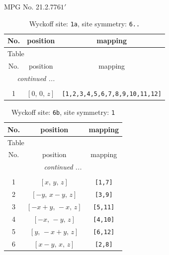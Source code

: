 \documentclass[fleqn,8pt]{jsarticle}
\begin{document}
\setcounter{MaxMatrixCols}{32}

\renewcommand{\tablename}{Table~}
\renewcommand{\figurename}{Figure~}
\begin{center}
\LARGE
MPG No. 21.2.77\quad$61'$
\end{center}
\renewcommand{\arraystretch}{1.2}
\begin{longtable}{ccc}
\caption{Wyckoff site: {\tt 1a}, site symmetry: {\tt 6..}}
 \\
 \hline \hline
No. & position & mapping \\ \hline \endfirsthead

\multicolumn{2}{l}{\tablename\ \thetable{}} \\
 \hline \hline
No. & position & mapping \\ \hline \endhead

 \hline \hline
\multicolumn{2}{r}{\footnotesize\it continued ...} \\ \endfoot

 \hline \hline
\multicolumn{2}{r}{} \\ \endlastfoot

1 & $\left[ 0,\, 0,\, z \right]$ & {\tt [1,2,3,4,5,6,7,8,9,10,11,12]} \\
\end{longtable}
\renewcommand{\arraystretch}{1.2}
\begin{longtable}{ccc}
\caption{Wyckoff site: {\tt 6b}, site symmetry: {\tt 1}}
 \\
 \hline \hline
No. & position & mapping \\ \hline \endfirsthead

\multicolumn{2}{l}{\tablename\ \thetable{}} \\
 \hline \hline
No. & position & mapping \\ \hline \endhead

 \hline \hline
\multicolumn{2}{r}{\footnotesize\it continued ...} \\ \endfoot

 \hline \hline
\multicolumn{2}{r}{} \\ \endlastfoot

1 & $\left[ x,\, y,\, z \right]$ & {\tt [1,7]} \\ \hline
2 & $\left[ - y,\, x - y,\, z \right]$ & {\tt [3,9]} \\ \hline
3 & $\left[ - x + y,\, - x,\, z \right]$ & {\tt [5,11]} \\ \hline
4 & $\left[ - x,\, - y,\, z \right]$ & {\tt [4,10]} \\ \hline
5 & $\left[ y,\, - x + y,\, z \right]$ & {\tt [6,12]} \\ \hline
6 & $\left[ x - y,\, x,\, z \right]$ & {\tt [2,8]} \\
\end{longtable}
\end{document}
